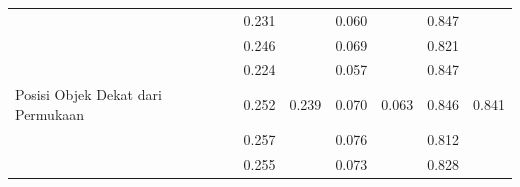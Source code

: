 \begin{table}[]
\begin{tabular}{|l|cc|cc|cc|}
                                                      & \multicolumn{1}{c|}{\cellcolor[HTML]{FFFFFF}0.231} & \cellcolor[HTML]{FFFFFF}                         & \multicolumn{1}{c|}{\cellcolor[HTML]{FFFFFF}0.060}  & \cellcolor[HTML]{FFFFFF}                           & \multicolumn{1}{c|}{\cellcolor[HTML]{FFFFFF}0.847} & \cellcolor[HTML]{FFFFFF}                        \\ \cline{2-2} \cline{4-4} \cline{6-6}
                                                      & \multicolumn{1}{c|}{\cellcolor[HTML]{FFFFFF}0.246} & \cellcolor[HTML]{FFFFFF}                         & \multicolumn{1}{c|}{\cellcolor[HTML]{FFFFFF}0.069} & \cellcolor[HTML]{FFFFFF}                           & \multicolumn{1}{c|}{\cellcolor[HTML]{FFFFFF}0.821} & \cellcolor[HTML]{FFFFFF}                        \\ \cline{2-2} \cline{4-4} \cline{6-6}
                                                      & \multicolumn{1}{c|}{\cellcolor[HTML]{FFFFFF}0.224} & \cellcolor[HTML]{FFFFFF}                         & \multicolumn{1}{c|}{\cellcolor[HTML]{FFFFFF}0.057}  & \cellcolor[HTML]{FFFFFF}                           & \multicolumn{1}{c|}{\cellcolor[HTML]{FFFFFF}0.847} & \cellcolor[HTML]{FFFFFF}                        \\ \cline{2-2} \cline{4-4} \cline{6-6}
  \multirow{-5}{*}{Posisi Objek Dekat dari Permukaan}                & \multicolumn{1}{c|}{\cellcolor[HTML]{FFFFFF}0.252} & \multirow{-5}{*}{\cellcolor[HTML]{FFFFFF}0.239} & \multicolumn{1}{c|}{\cellcolor[HTML]{FFFFFF}0.070} & \multirow{-5}{*}{\cellcolor[HTML]{FFFFFF}0.063} & \multicolumn{1}{c|}{\cellcolor[HTML]{FFFFFF}0.846} & \multirow{-5}{*}{\cellcolor[HTML]{FFFFFF}0.841} \\ \hline
                                                      & \multicolumn{1}{c|}{\cellcolor[HTML]{FFFFFF}0.257} & \cellcolor[HTML]{FFFFFF}                         & \multicolumn{1}{c|}{\cellcolor[HTML]{FFFFFF}0.076} & \cellcolor[HTML]{FFFFFF}                           & \multicolumn{1}{c|}{\cellcolor[HTML]{FFFFFF}0.812} & \cellcolor[HTML]{FFFFFF}                        \\ \cline{2-2} \cline{4-4} \cline{6-6}
                                                      & \multicolumn{1}{c|}{\cellcolor[HTML]{FFFFFF}0.255} & \cellcolor[HTML]{FFFFFF}                         & \multicolumn{1}{c|}{\cellcolor[HTML]{FFFFFF}0.073} & \cellcolor[HTML]{FFFFFF}                           & \multicolumn{1}{c|}{\cellcolor[HTML]{FFFFFF}0.828} & \cellcolor[HTML]{FFFFFF}                        \\ \cline{2-2} \cline{4-4} \cline{6-6}

\end{tabular}
\end{table}
